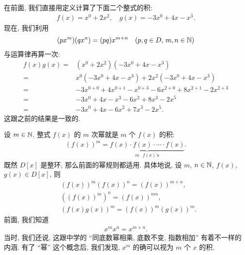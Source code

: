 \begin{example}
    在前面, 我们直接用定义计算了下面二个整式的积:
    \begin{align*}
        f(x) = x^0 + 2x^2, \quad g(x) = -3x^0 + 4x - x^3.
    \end{align*}
    现在, 我们利用
    \begin{align*}
        (px^m) (qx^n) = (pq) x^{m+n} \quad (p,q \in D, \, m,n \in \mathbb{N})
    \end{align*}
    与运算律再算一次:
    \begin{align*}
        f(x) g(x)
        = {} & (x^0 + 2x^2) (-3x^0 + 4x - x^3)                                 \\
        = {} & x^0 (-3x^0 + 4x - x^3) + 2x^2 (-3x^0 + 4x - x^3)                \\
        = {} & -3x^{0+0} + 4x^{0+1} - x^{0+3} - 6x^{2+0} + 8x^{2+1} - 2x^{2+3} \\
        = {} & -3x^0 + 4x - x^3 - 6x^2 + 8x^3 - 2x^5                           \\
        = {} & -3x^0 + 4x - 6x^2 + 7x^3 - 2x^5.
    \end{align*}
    这跟之前的结果是一致的.
\end{example}

\begin{definition}
    设 $m \in \mathbb{N}$. 整式 $f(x)$ 的 $m$ 次幂就是 $m$ 个 $f(x)$ 的积:
    \begin{align*}
        (f(x))^m = \underbrace{f(x) \cdot f(x) \cdot \cdots \cdot f(x)}_{\text{$m$ $f(x)$'s}}.
    \end{align*}
    既然 $D[x]$ 是整环, 那么前面的幂规则都适用. 具体地说, 设 $m$, $n \in \mathbb{N}$, $f(x)$, $g(x) \in D[x]$, 则
    \begin{align*}
         & (f(x))^m (f(x))^n = (f(x))^{m+n},  \\
         & ((f(x))^m)^n = (f(x))^{mn},        \\
         & (f(x) g(x))^m = (f(x))^m (g(x))^m.
    \end{align*}
    前面, 我们知道
    \begin{align*}
        x^m x^n = x^{m+n}.
    \end{align*}
    当时, 我们还说, 这跟中学的 ``同底数幂相乘, 底数不变, 指数相加'' 有着不一样的内涵. 有了 ``幂'' 这个概念后, 我们发现, $x^m$ 的确可以视为 $m$ 个 $x$ 的积.
\end{definition}

